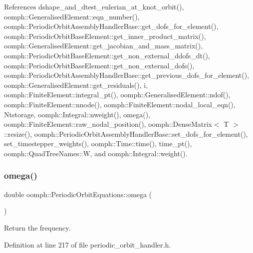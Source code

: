 References dshape\+\_\+and\+\_\+dtest\+\_\+eulerian\+\_\+at\+\_\+knot\+\_\+orbit(), oomph\+::\+Generalised\+Element\+::eqn\+\_\+number(), oomph\+::\+Periodic\+Orbit\+Assembly\+Handler\+Base\+::get\+\_\+dofs\+\_\+for\+\_\+element(), oomph\+::\+Periodic\+Orbit\+Base\+Element\+::get\+\_\+inner\+\_\+product\+\_\+matrix(), oomph\+::\+Generalised\+Element\+::get\+\_\+jacobian\+\_\+and\+\_\+mass\+\_\+matrix(), oomph\+::\+Periodic\+Orbit\+Base\+Element\+::get\+\_\+non\+\_\+external\+\_\+ddofs\+\_\+dt(), oomph\+::\+Periodic\+Orbit\+Base\+Element\+::get\+\_\+non\+\_\+external\+\_\+dofs(), oomph\+::\+Periodic\+Orbit\+Assembly\+Handler\+Base\+::get\+\_\+previous\+\_\+dofs\+\_\+for\+\_\+element(), oomph\+::\+Generalised\+Element\+::get\+\_\+residuals(), i, oomph\+::\+Finite\+Element\+::integral\+\_\+pt(), oomph\+::\+Generalised\+Element\+::ndof(), oomph\+::\+Finite\+Element\+::nnode(), oomph\+::\+Finite\+Element\+::nodal\+\_\+local\+\_\+eqn(), Ntstorage, oomph\+::\+Integral\+::nweight(), omega(), oomph\+::\+Finite\+Element\+::raw\+\_\+nodal\+\_\+position(), oomph\+::\+Dense\+Matrix$<$ T $>$\+::resize(), oomph\+::\+Periodic\+Orbit\+Assembly\+Handler\+Base\+::set\+\_\+dofs\+\_\+for\+\_\+element(), set\+\_\+timestepper\+\_\+weights(), oomph\+::\+Time\+::time(), time\+\_\+pt(), oomph\+::\+Quad\+Tree\+Names\+::W, and oomph\+::\+Integral\+::weight().

\mbox{\label{classoomph_1_1PeriodicOrbitEquations_ae301cd215d5c6aff365fd077ff8055de}} 
\subsubsection{\texorpdfstring{omega()}{omega()}}
{\footnotesize\ttfamily double oomph\+::\+Periodic\+Orbit\+Equations\+::omega (\begin{DoxyParamCaption}{ }\end{DoxyParamCaption})\hspace{0.3cm}{\ttfamily [inline]}}



Return the frequency. 



Definition at line 217 of file periodic\+\_\+orbit\+\_\+handler.\+h.



